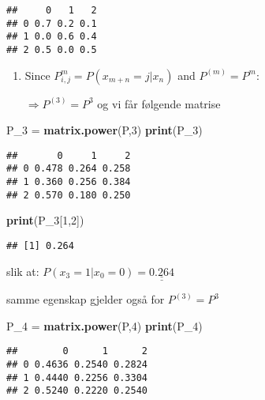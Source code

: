 \documentclass[]{article}
\newenvironment{Shaded}{\begin{snugshade}}{\end{snugshade}}
\newcommand{\DecValTok}[1]{\textcolor[rgb]{0.00,0.00,0.81}{#1}}
\newcommand{\KeywordTok}[1]{\textcolor[rgb]{0.13,0.29,0.53}{\textbf{#1}}}
\newcommand{\NormalTok}[1]{#1}
\newcommand{\StringTok}[1]{\textcolor[rgb]{0.31,0.60,0.02}{#1}}
\begin{document}
\begin{verbatim}
##     0   1   2
## 0 0.7 0.2 0.1
## 1 0.0 0.6 0.4
## 2 0.5 0.0 0.5
\end{verbatim}

\begin{enumerate}
\def\labelenumi{\alph{enumi})}
\item
  Since \(P_{i,j}^{m} = P(x_{m+n}=j|x_{n})\) and \(P^{(m)}=P^{m}\):

  \(\Rightarrow{P^{(3)}=P^{3}}\) og vi får følgende matrise
\end{enumerate}

\begin{Shaded}
\begin{Highlighting}[]
\NormalTok{P_}\DecValTok{3}\NormalTok{ =}\StringTok{ }\KeywordTok{matrix.power}\NormalTok{(P,}\DecValTok{3}\NormalTok{)}
\KeywordTok{print}\NormalTok{(P_}\DecValTok{3}\NormalTok{)}
\end{Highlighting}
\end{Shaded}

\begin{verbatim}
##       0     1     2
## 0 0.478 0.264 0.258
## 1 0.360 0.256 0.384
## 2 0.570 0.180 0.250
\end{verbatim}

\begin{Shaded}
\begin{Highlighting}[]
\KeywordTok{print}\NormalTok{(P_}\DecValTok{3}\NormalTok{[}\DecValTok{1}\NormalTok{,}\DecValTok{2}\NormalTok{])}
\end{Highlighting}
\end{Shaded}

\begin{verbatim}
## [1] 0.264
\end{verbatim}

slik at: \(P(x_{3}=1|x_{0}=0) = \underline{\underline{0.264}}\)

samme egenskap gjelder også for \(P^{(3)}=P^{3}\)

\begin{Shaded}
\begin{Highlighting}[]
\NormalTok{P_}\DecValTok{4}\NormalTok{ =}\StringTok{ }\KeywordTok{matrix.power}\NormalTok{(P,}\DecValTok{4}\NormalTok{)}
\KeywordTok{print}\NormalTok{(P_}\DecValTok{4}\NormalTok{)}
\end{Highlighting}
\end{Shaded}

\begin{verbatim}
##        0      1      2
## 0 0.4636 0.2540 0.2824
## 1 0.4440 0.2256 0.3304
## 2 0.5240 0.2220 0.2540
\end{verbatim}
\end{document}
